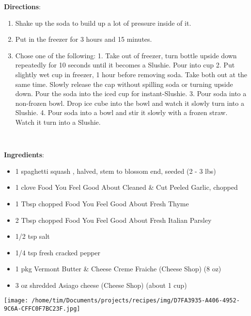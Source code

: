 \documentclass[11pt, twoside, openany]{book}
\begin{document}
\textbf{Directions}:
\vspace{-3mm}\begin{enumerate}\setlength\itemsep{-1mm}
\item Shake up the soda to build up a lot of pressure inside of it.
\item Put in the freezer for 3 hours and 15 minutes.
\item Chose one of the following:
1. Take out of freezer, turn bottle upside down repeatedly for 10 seconds until it becomes a Slushie. Pour into cup
2. Put slightly wet cup in freezer, 1 hour before removing soda. Take both out at the same time. Slowly release the cap without spilling soda or turning upside down. Pour the soda into the iced cup for instant-Slushie.
3. Pour soda into a non-frozen bowl. Drop ice cube into the bowl and watch it slowly turn into a Slushie.
4. Pour soda into a bowl and stir it slowly with a frozen straw. Watch it turn into a Slushie.
\end{enumerate}
 \label{spaghetti-squash-gratin}\hfill\textit{}\\
\begin{minipage}[t]{0.8\linewidth}
\textbf{Ingredients}:\vspace{-3mm}
\begin{multicols}{2}
\begin{itemize}\setlength\itemsep{-1mm}
\item 1 spaghetti squash , halved, stem to blossom end, seeded (2 - 3 lbs)
\item 1 clove Food You Feel Good About Cleaned & Cut Peeled Garlic, chopped
\item 1 Tbsp chopped Food You Feel Good About Fresh Thyme
\item 2 Tbsp chopped Food You Feel Good About Fresh Italian Parsley
\item 1/2 tsp salt
\item 1/4 tsp fresh cracked pepper
\item 1 pkg Vermont Butter & Cheese Creme Fraiche (Cheese Shop) (8 oz)
\item 3 oz shredded Asiago cheese (Cheese Shop) (about 1 cup)
\end{itemize}
\end{multicols}
\end{minipage}
\begin{minipage}[t]{0.2\linewidth}
\centering \strut\vspace*{-\baselineskip}\newline
\texttt{[image: /home/tim/Documents/projects/recipes/img/D7FA3935-A406-4952-9C6A-CFFC0F7BC23F.jpg]}\\
\end{minipage}\vspace{3mm}
\end{document}
